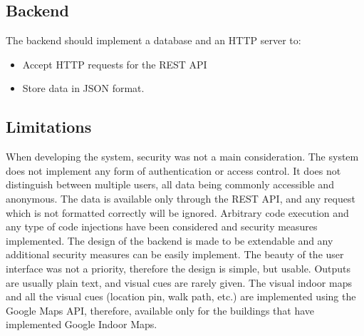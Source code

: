 \subsection{Backend}
The backend should implement a database and an HTTP server to:
	\begin{itemize}
		\item Accept HTTP requests for the REST API
		\item Store data in JSON format.
	\end{itemize}

\subsection{Limitations}
When developing the system, security was not a main consideration. The system does not implement any form of authentication or access control. It does not distinguish between multiple users, all data being commonly accessible and anonymous. 
The data is available only through the REST API, and any request which is not formatted correctly will be ignored. Arbitrary code execution and any type of code injections have been considered and security measures implemented.
The design of the backend is made to be extendable and any additional security measures can be easily implement.
The beauty of the user interface was not a priority, therefore the design is simple, but usable. Outputs are usually plain text, and visual cues are rarely given. 
The visual indoor maps and all the visual cues (location pin, walk path, etc.) are implemented using the Google Maps API, therefore, available only for the buildings that have implemented Google Indoor Maps.





